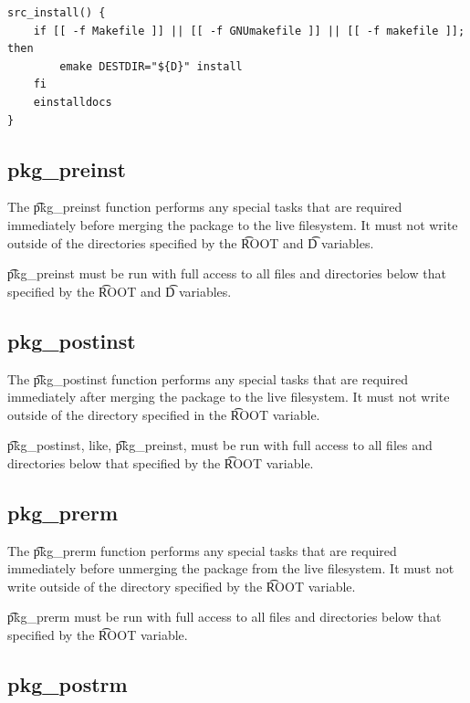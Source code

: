 \begin{listing}[H]
\caption{\t{src_install}, format~6} \label{lst:src-install-6}
\begin{verbatim}
src_install() {
    if [[ -f Makefile ]] || [[ -f GNUmakefile ]] || [[ -f makefile ]]; then
        emake DESTDIR="${D}" install
    fi
    einstalldocs
}
\end{verbatim}
\end{listing}

\subsection{pkg_preinst}

The \t{pkg_preinst} function performs any special tasks that are required immediately before
merging the package to the live filesystem. It must not write outside of the directories specified
by the \t{ROOT} and \t{D} variables.

\t{pkg_preinst} must be run with full access to all files and directories below that specified by
the \t{ROOT} and \t{D} variables.

\subsection{pkg_postinst}

The \t{pkg_postinst} function performs any special tasks that are required immediately after
merging the package to the live filesystem. It must not write outside of the directory specified
in the \t{ROOT} variable.

\t{pkg_postinst}, like, \t{pkg_preinst}, must be run with full access to all files and directories
below that specified by the \t{ROOT} variable.

\subsection{pkg_prerm}

The \t{pkg_prerm} function performs any special tasks that are required immediately before
unmerging the package from the live filesystem. It must not write outside of the directory specified
by the \t{ROOT} variable.

\t{pkg_prerm} must be run with full access to all files and directories below that specified by
the \t{ROOT} variable.

\subsection{pkg_postrm}

